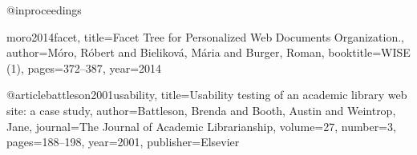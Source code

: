 @inproceedings{moro2014facet,
  title={Facet Tree for Personalized Web Documents Organization.},
  author={M{\'o}ro, R{\'o}bert and Bielikov{\'a}, M{\'a}ria and Burger, Roman},
  booktitle={WISE (1)},
  pages={372--387},
  year={2014}

@article{battleson2001usability,
  title={Usability testing of an academic library web site: a case study},
  author={Battleson, Brenda and Booth, Austin and Weintrop, Jane},
  journal={The Journal of Academic Librarianship},
  volume={27},
  number={3},
  pages={188--198},
  year={2001},
  publisher={Elsevier}
}
}

